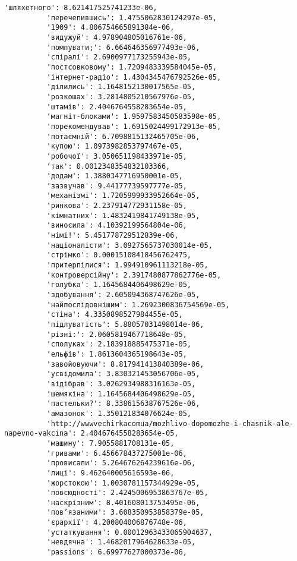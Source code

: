 \documentclass[11pt]{article}
\begin{document}
\begin{Verbatim}[commandchars=\\\{\}]
          'шляхетного': 8.621417525741233e-06,
          'перечепившись': 1.4755062830124297e-05,
          '1909': 4.806754665891384e-06,
          'видужуй': 4.978904805016761e-06,
          'помпувати;': 6.664646356977493e-06,
          'спіралі': 2.6900977173255943e-05,
          'постсовковому': 1.7209483339584045e-05,
          'інтернет-радіо': 1.4304345476792526e-05,
          'ділились': 1.1648152130017565e-05,
          'розкошах': 3.2814805210567976e-05,
          'штамів': 2.4046764558283654e-05,
          'магніт-блоками': 1.9597583450583598e-05,
          'порекомендував': 1.6915024499172913e-05,
          'потаємній': 6.7098815132465705e-06,
          'купою': 1.0973982853797467e-05,
          'робочої': 3.050651198433971e-05,
          'так': 0.0012348354832103366,
          'додам': 1.3880347716950001e-05,
          'зазвучав': 9.44177739597777e-05,
          'механізмі': 1.7205999933952664e-05,
          'ринкова': 2.237914772931158e-05,
          'кімнатних': 1.4832419841749138e-05,
          'виносила': 4.10392199564804e-06,
          'німі!': 5.451778729512839e-06,
          'націоналісти': 3.0927565737030014e-05,
          'стрімко': 0.00015108418456762475,
          'притерпілися': 1.994910961113218e-05,
          'контроверсійну': 2.3917480877862776e-05,
          'голубка': 1.1645684406498629e-05,
          'здобування': 2.605094368747626e-05,
          'найпослідовнішим': 1.2692300836754569e-05,
          'стіна': 4.3350898527984455e-05,
          'підлуватість': 5.88057031498014e-06,
          'різні:': 2.0605819467718648e-05,
          'сполуках': 2.183918885475371e-05,
          'ельфів': 1.8613604365198643e-05,
          'завойовуючи': 8.817941413840389e-06,
          'усвідомила': 3.830321453056706e-05,
          'відібрав': 3.0262934988316163e-05,
          'шемякіна': 1.1645684406498629e-05,
          'пастельки?': 8.338615638767526e-06,
          'амазонок': 1.350121834076624e-05,
          'http://wwwvechirkacomua/mozhlivo-dopomozhe-i-chasnik-ale-napevno-vakcina': 2.4046764558283654e-05,
          'машину': 7.9055881708131e-05,
          'гривами': 6.456678437275001e-06,
          'провисали': 5.264676264239616e-06,
          'лиці': 9.462640005616593e-06,
          'жорстокою': 1.0030781157344929e-05,
          'повсюдності': 2.4245006953863767e-05,
          'наскрізним': 8.401608013753495e-06,
          'пов’язаними': 3.608350953858379e-05,
          'єрархії': 4.200804006876748e-06,
          'устаткування': 0.00012963433065904637,
          'невдячна': 1.4682017964628633e-05,
          'passions': 6.69977627000373e-06,

\end{Verbatim}
\end{document}
